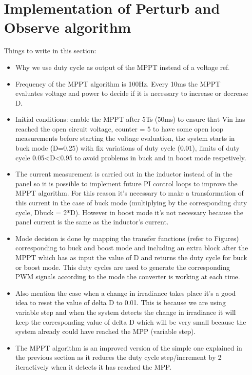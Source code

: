 \section{Implementation of Perturb and Observe algorithm}\label{MPPTImplementation}

Things to write in this section: 
\begin{itemize}
	\item Why we use duty cycle as output of the MPPT instead of a voltage ref. 
	\item Frequency of the MPPT algorithm is 100Hz. Every 10ms the MPPT evaluates voltage and power to decide if it is necessary to increase or decrease D. 
	\item Initial conditions: enable the MPPT after 5Ts (50ms) to ensure that Vin has reached the open circuit voltage, counter = 5 to have some open loop measurements before starting the voltage evaluation, the system starts in buck mode (D=0.25) with fix variations of duty cycle (0.01), limits of duty cycle 0.05<D<0.95 to avoid problems in buck and in boost mode respetively. 
	\item The current measurement is carried out in the inductor instead of in the panel so it is possible to implement future PI control loops to improve the MPPT algorithm. For this reason it's necessary to make a transformation of this current in the case of buck mode (multiplying by the corresponding duty cycle, Dbuck = 2*D). However in boost mode it's not necessary because the panel current is the same as the inductor's current. 
	\item Mode decision is done by mapping the transfer functions (refer to Figures) corresponding to buck and boost mode and including an extra block after the MPPT which has as input the value of D and returns the duty cycle for buck or boost mode. This duty cycles are used to generate the corresponding PWM signals according to the mode the converter is working at each time. 
	\item Also mention the case when a change in irradiance takes place it's a good idea to reset the value of delta D to 0.01. This is because we are using variable step and when the system detects the change in irradiance it will keep the corresponding value of delta D which will be very small because the system already could have reached the MPP (variable step). 
	\item The MPPT algorithm is an improved version of the simple one explained in the previous section as it reduces the duty cycle step/increment by 2 iteractively when it detects it has reached the MPP.

\end{itemize}


